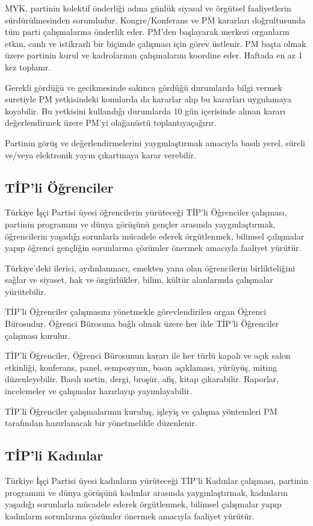 \documentclass[11pt]{article} %
\begin{document}
MYK, partinin kolektif önderliǧi adına günlük siyasal ve örgütsel faaliyetlerin sürdürülmesinden sorumludur. Kongre/Konferans ve PM kararları doǧrultusunda tüm parti çalışmalarına önderlik eder. PM’den başlayarak merkezi organların etkin, canlı ve istikrarlı bir biçimde çalışması için görev üstlenir. PM başta olmak üzere partinin kurul ve kadrolarının çalışmalarını koordine eder. Haftada en az  1 kez toplanır.

Gerekli gördüǧü ve gecikmesinde sakınca gördüǧü durumlarda bilgi vermek suretiyle PM yetkisindeki konularda da kararlar alıp bu kararları uygulamaya koyabilir. Bu yetkisini kullandıǧı durumlarda 10 gün içerisinde alınan kararı deǧerlendirmek üzere PM’yi olaǧanüstü toplantıyaçaǧırır.

Partinin görüş ve deǧerlendirmelerini yaygınlaştırmak amacıyla basılı yerel, süreli ve/veya elektronik yayın çıkartmaya karar verebilir.


\subsection{TİP’li Öǧrenciler}
Türkiye İşçi Partisi üyesi öǧrencilerin yürüteceǧi TİP’li Öǧrenciler çalışması, partinin programını ve dünya görüşünü gençler arasında yaygınlaştırmak, öǧrencilerin yaşadıǧı sorunlarla mücadele ederek örgütlenmek, bilimsel çalışmalar yapıp öǧrenci gençliǧin sorunlarına çözümler önermek amacıyla faaliyet yürütür.

Türkiye’deki ilerici, aydınlanmacı, emekten yana olan öǧrencilerin birlikteliǧini saǧlar ve siyaset, hak ve özgürlükler, bilim, kültür alanlarında çalışmalar yürütebilir.

TİP’li Öǧrenciler çalışmasını yönetmekle görevlendirilen organ Öǧrenci Bürosudur. Öǧrenci Bürosuna baǧlı olmak üzere her ilde TİP’li Öǧrenciler çalışması kurulur.

TİP’li Öǧrenciler, Öǧrenci Bürosunun kararı ile her türlü kapalı ve açık salon etkinliǧi, konferans, panel, sempozyum, basın açıklaması, yürüyüş, miting düzenleyebilir. Basılı metin, dergi, broşür, afiş, kitap çıkarabilir. Raporlar, incelemeler ve çalışmalar hazırlayıp yayımlayabilir.

TİP’li Öǧrenciler çalışmalarının kuruluş, işleyiş ve çalışma yöntemleri PM tarafından hazırlanacak bir yönetmelikle düzenlenir.


\subsection{TİP’li Kadınlar}
Türkiye İşçi Partisi üyesi kadınların yürüteceǧi TİP’li Kadınlar çalışması, partinin programını ve dünya görüşünü kadınlar arasında yaygınlaştırmak, kadınların yaşadıǧı sorunlarla mücadele ederek örgütlenmek, bilimsel çalışmalar yapıp kadınların sorunlarına çözümler önermek amacıyla faaliyet yürütür.
\end{document}
